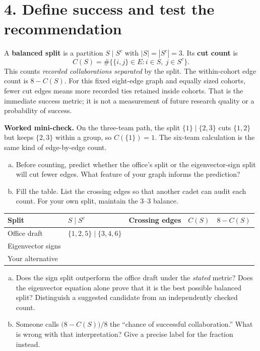 \documentclass[10pt,letterpaper]{article}
\begin{document}
\newpage
\section*{4. Define success and test the recommendation}
A \textbf{balanced split} is a partition $S\mid S^c$ with $|S|=|S^c|=3$. Its \textbf{cut count} is
\[
C(S)=\#\bigl\{\{i,j\}\in E: i\in S,\ j\in S^c\bigr\}.
\]
This counts \emph{recorded collaborations separated} by the split. The within-cohort edge count is $8-C(S)$. For this fixed eight-edge graph and equally sized cohorts, fewer cut edges means more recorded ties retained inside cohorts. That is the immediate success metric; it is not a measurement of future research quality or a probability of success.

\textbf{Worked mini-check.} On the three-team path, the split $\{1\}\mid\{2,3\}$ cuts $\{1,2\}$ but keeps $\{2,3\}$ within a group, so $C(\{1\})=1$. The six-team calculation is the same kind of edge-by-edge count.

\begin{enumerate}[a.,leftmargin=*]
\item Before counting, predict whether the office's split or the eigenvector-sign split will cut fewer edges. What feature of your graph informs the prediction?\\[0.42in]
\item Fill the table. List the crossing edges so that another cadet can audit each count. For your own split, maintain the $3$--$3$ balance.
\end{enumerate}
\begin{tabularx}{\linewidth}{@{}p{1.38in}p{1.40in}Yp{0.64in}p{0.64in}@{}}
\toprule
Split & $S\mid S^c$ & Crossing edges & $C(S)$ & $8-C(S)$\\
\midrule
Office draft & $\{1,2,5\}\mid\{3,4,6\}$ & \rule{0pt}{0.62in} & & \\
Eigenvector signs & & \rule{0pt}{0.62in} & & \\
Your alternative & & \rule{0pt}{0.62in} & & \\
\bottomrule
\end{tabularx}

\begin{enumerate}[c.,leftmargin=*]
\item Does the sign split outperform the office draft under the \emph{stated} metric? Does the eigenvector equation alone prove that it is the best possible balanced split? Distinguish a suggested candidate from an independently checked count.\\[0.55in]
\item Someone calls $\bigl(8-C(S)\bigr)/8$ the ``chance of successful collaboration.'' What is wrong with that interpretation? Give a precise label for the fraction instead.\\[0.52in]
\end{enumerate}
\end{document}

